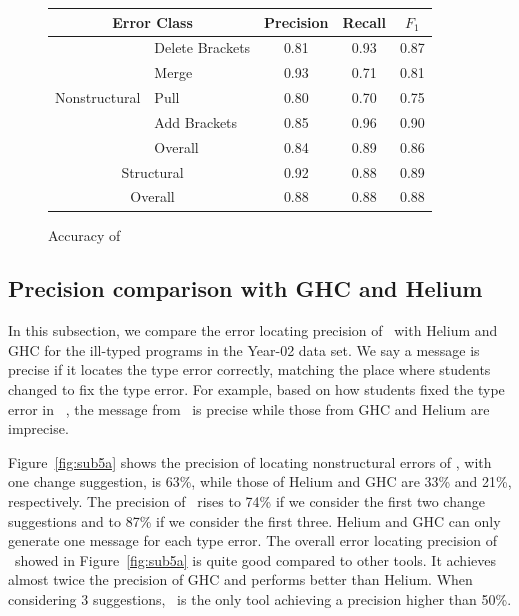 \documentclass[12pt]{report}	%
\begin{document}
\begin{figure}
\centering
\begin{tabular}{ r| l | c  c  c }
\toprule
  \multicolumn{2}{c|}{Error Class} & Precision & Recall & $F_1$  \\ 
\midrule
\multirow{5}{*}{Nonstructural}
&  Delete Brackets & 0.81 & 0.93 & 0.87 \\ 
&  Merge & 0.93 & 0.71 & 0.81 \\ 
&  Pull & 0.80 & 0.70 & 0.75 \\ 
&  Add Brackets & 0.85 & 0.96 & 0.90 \\ 
&  Overall & 0.84 & 0.89 & 0.86 \\
\midrule
\multicolumn{2}{c|}{Structural} & 0.92 & 0.88 & 0.89 \\ 
\midrule
\multicolumn{2}{c|}{Overall} & 0.88 & 0.88 & 0.88 \\
\bottomrule
\end{tabular}
\caption{Accuracy of \newCompiler}
\label{fig:sub4b}
\end{figure}

\subsection{Precision comparison with GHC and Helium}
\label{sec:eval:error-location}

In this subsection, we compare the error 
locating precision 
of \newCompiler\ with Helium and GHC
for the ill-typed
programs in the Year-02 data set.
%
We say a message is precise if it locates the
type error correctly, matching the 
place where students changed to fix the type 
error. For example, based on how students 
fixed the type error in ~\cite{Hage09:Neon}, 
the message from \newCompiler\ is  precise
while those from GHC and Helium are imprecise.

Figure~\ref{fig:sub5a} shows the precision of locating nonstructural errors 
of \newCompiler,
with one change suggestion,
is 63\%, 
while those of Helium and GHC are 33\% and 21\%, respectively.
The precision of \newCompiler\ rises to 74\% if
we consider the first two change suggestions 
and to 87\% if
we consider the first three. 
Helium and GHC can only generate
one message for each type error.
%
The overall error locating
precision of
\newCompiler\ showed in Figure~\ref{fig:sub5a} 
is quite good compared to other tools.
It achieves
almost twice the precision of GHC and
performs better than Helium. When considering
3 suggestions, \newCompiler\
is the only tool achieving a precision higher than 50\%.
\end{document}
